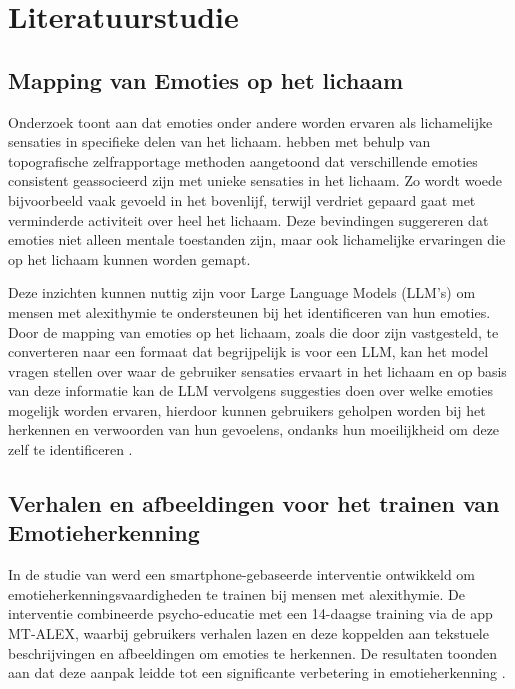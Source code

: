 \section{Literatuurstudie}%
\label{sec:literatuurstudie}

\subsection{Mapping van Emoties op het lichaam}
\label{subsec:mapping-van-emoties-op-het-lichaam}%

Onderzoek toont aan dat emoties onder andere worden ervaren als lichamelijke sensaties in specifieke delen van het lichaam. \textcite{Nummenmaa2013} hebben met behulp van topografische zelfrapportage methoden aangetoond dat verschillende emoties consistent geassocieerd zijn met unieke sensaties in het lichaam. Zo wordt woede bijvoorbeeld vaak gevoeld in het bovenlijf, terwijl verdriet gepaard gaat met verminderde activiteit over heel het lichaam. Deze bevindingen suggereren dat emoties niet alleen mentale toestanden zijn, maar ook lichamelijke ervaringen die op het lichaam kunnen worden gemapt.

Deze inzichten kunnen nuttig zijn voor Large Language Models (LLM's) om mensen met alexithymie te ondersteunen bij het identificeren van hun emoties. Door de mapping van emoties op het lichaam, zoals die door \textcite{Nummenmaa2013} zijn vastgesteld, te converteren naar een formaat dat begrijpelijk is voor een LLM, kan het model vragen stellen over waar de gebruiker sensaties ervaart in het lichaam en op basis van deze informatie kan de LLM vervolgens suggesties doen over welke emoties mogelijk worden ervaren, hierdoor kunnen gebruikers geholpen worden bij het herkennen en verwoorden van hun gevoelens, ondanks hun moeilijkheid om deze zelf te identificeren \autocite{Nummenmaa2013}.

\subsection{Verhalen en afbeeldingen voor het trainen van Emotieherkenning}
\label{subsec:verhalen-en-afbeeldingen-voor-het-trainen-van-emotieherkenning}%

In de studie van \textcite{Lukas2019} werd een smartphone-gebaseerde interventie ontwikkeld om emotieherkenningsvaardigheden te trainen bij mensen met alexithymie. De interventie combineerde psycho-educatie met een 14-daagse training via de app MT-ALEX, waarbij gebruikers verhalen lazen en deze koppelden aan tekstuele beschrijvingen en afbeeldingen om emoties te herkennen. De resultaten toonden aan dat deze aanpak leidde tot een significante verbetering in emotieherkenning \autocite{Lukas2019}.

